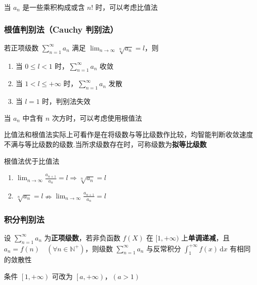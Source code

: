 \documentclass[lang = zh , final , oneside , openany , titlepage , zihao = -4 , linespread = 1.3 , baselineskip = false , cjk-font = windows , text-font = newtx , math-font = newtx , math-style = ISO , uppercase-greek = upright , integral-limits = false]{sjtureport}
\begin{document}
\begin{remark}
    当 \(a_n\) 是一些乘积构成或含 \(n!\) 时，可以考虑比值法
\end{remark}

\subsubsection{根值判别法（Cauchy 判别法）}

\begin{theorem}
若正项级数 \(\displaystyle \sum_{n=1}^\infty a_n\) 满足
\(\displaystyle \lim_{n\to\infty} \sqrt[n]{a_n} = l\)，则

\begin{enumerate}
\def\labelenumi{\arabic{enumi}.}
\item
  当 \(0\leq l<1\) 时，\(\displaystyle \sum_{n=1}^\infty a_n\) 收敛
\item
  当 \(1 < l \leq +\infty\) 时，\(\displaystyle \sum_{n=1}^\infty a_n\)
  发散
\item
  当 \(l=1\) 时，判别法失效
\end{enumerate}
\end{theorem}

\begin{remark}
    当 \(a_n\) 中含有 \(n\) 次方时，可以考虑使用根值法
\end{remark}

\begin{remark}
    比值法和根值法实际上可看作是在将级数与等比级数作比较，均智能判断收敛速度不满与等比级数的级数.当所求级数存在时，可称级数为\textbf{拟等比级数}
\end{remark}

\begin{remark}
    根值法优于比值法
    \begin{enumerate}
\item
  \(\displaystyle\lim_{n\to\infty}\frac{a_{n+1}}{a_n} =  l \Rightarrow \displaystyle \sqrt[n]{a_n} = l\)
\item
  \(\displaystyle \sqrt[n]{a_n} =l \nRightarrow \displaystyle\lim_{n\to\infty}\frac{a_{n+1}}{a_n} =  l\)
\end{enumerate}
\end{remark}

\subsubsection{积分判别法}

\begin{definition}
    设 \(\displaystyle \sum_{n=1}^\infty a_n\)
为\textbf{正项级数}，若非负函数 \(f(X)\) 在 \([1,+\infty)\)
上\textbf{单调递减}，且
\(a_n = f(n)\quad \left(\forall n \in \mathbb{N}^+\right)\)，则级数
\(\displaystyle \sum_{n=1}^\infty a_n\) 与反常积分
\(\displaystyle \int_1^{+\infty} f(x)\,\mathrm{d}x\) 有相同的敛散性

\begin{remark}
\item
  条件 \(\left[1,+\infty\right)\) 可改为
  \(\left[a,+\infty\right)，(a>1)\)
\end{remark}
\end{definition}
\end{document}
